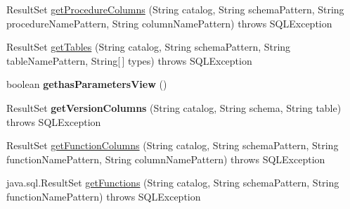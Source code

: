 \begin{DoxyCompactItemize}
\item 
Result\+Set \mbox{\hyperlink{classcom_1_1mysql_1_1jdbc_1_1_database_meta_data_using_info_schema_a2bb17e6501848d501ed65ee886ed4225}{get\+Procedure\+Columns}} (String catalog, String schema\+Pattern, String procedure\+Name\+Pattern, String column\+Name\+Pattern)  throws S\+Q\+L\+Exception 
\item 
Result\+Set \mbox{\hyperlink{classcom_1_1mysql_1_1jdbc_1_1_database_meta_data_using_info_schema_a77e696e0c2b875ddbf17513a1be3f6a3}{get\+Tables}} (String catalog, String schema\+Pattern, String table\+Name\+Pattern, String\mbox{[}$\,$\mbox{]} types)  throws S\+Q\+L\+Exception 
\item 
\mbox{\label{classcom_1_1mysql_1_1jdbc_1_1_database_meta_data_using_info_schema_a671b98658bfeb0335ad1099ebede527d}} 
boolean {\bfseries gethas\+Parameters\+View} ()
\item 
\mbox{\label{classcom_1_1mysql_1_1jdbc_1_1_database_meta_data_using_info_schema_af84372ae6814c8b39bc67cf6af6ee5f9}} 
Result\+Set {\bfseries get\+Version\+Columns} (String catalog, String schema, String table)  throws S\+Q\+L\+Exception 
\item 
Result\+Set \mbox{\hyperlink{classcom_1_1mysql_1_1jdbc_1_1_database_meta_data_using_info_schema_a2fa8933408d13c24d5bb5cc008a40bb0}{get\+Function\+Columns}} (String catalog, String schema\+Pattern, String function\+Name\+Pattern, String column\+Name\+Pattern)  throws S\+Q\+L\+Exception 
\item 
java.\+sql.\+Result\+Set \mbox{\hyperlink{classcom_1_1mysql_1_1jdbc_1_1_database_meta_data_using_info_schema_a6c98ce4fc7444e6f16442fb9b450fb72}{get\+Functions}} (String catalog, String schema\+Pattern, String function\+Name\+Pattern)  throws S\+Q\+L\+Exception 
\end{DoxyCompactItemize}

